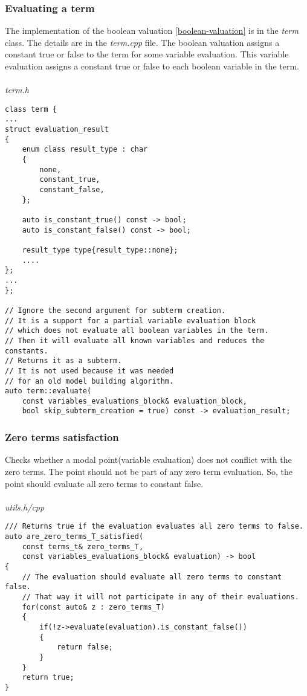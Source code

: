 \documentclass{article}
\begin{document}
	\newpage
	\subsubsection*{Evaluating a term}
	The implementation of the boolean valuation \ref{boolean-valuation} is in the \textit{term} class. The details are in the \textit{term.cpp} file.
	The boolean valuation assigns a constant true or false to the term for some variable evaluation. This variable evaluation assigns a constant true or false to each boolean variable in the term.
	\\
	\\
\noindent
\textit{term.h}
\begin{lstlisting}
class term {
...
struct evaluation_result
{
    enum class result_type : char
    {
        none,
        constant_true,
        constant_false,
    };

    auto is_constant_true() const -> bool;
    auto is_constant_false() const -> bool;

    result_type type{result_type::none};
	....
};
...
};

// Ignore the second argument for subterm creation.
// It is a support for a partial variable evaluation block
// which does not evaluate all boolean variables in the term.
// Then it will evaluate all known variables and reduces the constants.
// Returns it as a subterm.
// It is not used because it was needed
// for an old model building algorithm.
auto term::evaluate(
	const variables_evaluations_block& evaluation_block,
	bool skip_subterm_creation = true) const -> evaluation_result;
\end{lstlisting}

	\newpage
	\subsubsection*{Zero terms satisfaction}
	Checks whether a modal point(variable evaluation) does not conflict with the zero terms. The point should not be part of any zero term evaluation. So, the point should evaluate all zero terms to constant false.
	\\
	\\
\noindent
\textit{utils.h/cpp}
\begin{lstlisting}
/// Returns true if the evaluation evaluates all zero terms to false.
auto are_zero_terms_T_satisfied(
	const terms_t& zero_terms_T,
	const variables_evaluations_block& evaluation) -> bool
{
    // The evaluation should evaluate all zero terms to constant false.
    // That way it will not participate in any of their evaluations.
    for(const auto& z : zero_terms_T)
    {
        if(!z->evaluate(evaluation).is_constant_false())
        {
            return false;
        }
    }
    return true;
}
\end{lstlisting}
\end{document}
